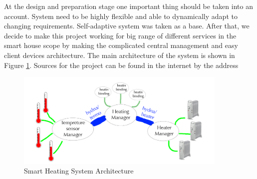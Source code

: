 \par At the design and preparation stage one important thing should be taken into an account. System need to be highly flexible and able to dynamically adapt to changing requirements. Self-adaptive system was taken as a base. After that, we decide to make this project working for big range of different services in the smart house scope by making the complicated central management and easy client devices architecture. The main architecture of the system is shown in Figure \ref{fig:system_architecture}.
Sources for the project can be found in the internet by the address %
\begin{figure}
	\centering    	
\includegraphics[width=0.90\textwidth,natwidth=610,natheight=642]{figs/system_architecture.png}
  	\caption{Smart Heating System Architecture}
  	\label{fig:system_architecture}
\end{figure}

